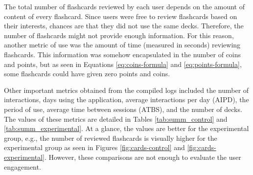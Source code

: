 The total number of flashcards reviewed by each user depends on the amount of content of every flashcard. Since users were free to review flashcards based on their interests, chances are that they did not use the same decks. Therefore, the number of flashcards might not provide enough information. For this reason, another metric of use was the amount of time (measured in seconds) reviewing flashcards. This information was somehow encapsulated in the number of coins and points, but as seen in Equations \ref{eq:coins-formula} and \ref{eq:points-formula}, some flashcards could have given zero points and coins.

Other important metrics obtained from the compiled logs included the number of interactions, days using the application, average interactions per day (AIPD), the period of use, average time between sessions (ATBS), and the number of decks. The values of these metrics are detailed in Tables \ref{tab:summ_control} and \ref{tab:summ_experimental}. At a glance, the values are better for the experimental group, e.g., the number of reviewed flashcards is visually higher for the experimental group as seen in Figures \ref{fig:cards-control} and \ref{fig:cards-experimental}. However, these comparisons are not enough to evaluate the user engagement.

